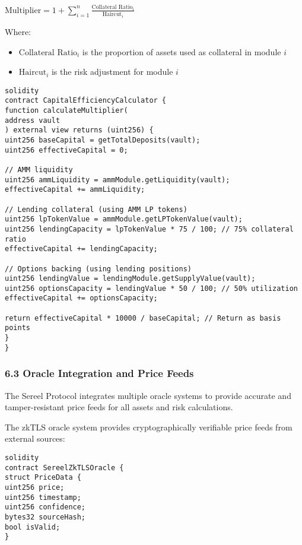\documentclass[12pt]{article}
\begin{document}
{{{$\text{Multiplier} = 1 + \sum_{i=1}^{n} \frac{\text{Collateral Ratio}_i}{\text{Haircut}_i}$

Where:
\begin{itemize}
	\item $\text{Collateral Ratio}_i$ is the proportion of assets used as collateral in module $i$
	\item $\text{Haircut}_i$ is the risk adjustment for module $i$

\end{itemize}

\begin{lstlisting}
solidity
contract CapitalEfficiencyCalculator {
function calculateMultiplier(
address vault
) external view returns (uint256) {
uint256 baseCapital = getTotalDeposits(vault);
uint256 effectiveCapital = 0;

// AMM liquidity
uint256 ammLiquidity = ammModule.getLiquidity(vault);
effectiveCapital += ammLiquidity;

// Lending collateral (using AMM LP tokens)
uint256 lpTokenValue = ammModule.getLPTokenValue(vault);
uint256 lendingCapacity = lpTokenValue * 75 / 100; // 75% collateral ratio
effectiveCapital += lendingCapacity;

// Options backing (using lending positions)
uint256 lendingValue = lendingModule.getSupplyValue(vault);
uint256 optionsCapacity = lendingValue * 50 / 100; // 50% utilization
effectiveCapital += optionsCapacity;

return effectiveCapital * 10000 / baseCapital; // Return as basis points
}
}
\end{lstlisting}

\subsubsection{6.3 Oracle Integration and Price Feeds} %

The Sereel Protocol integrates multiple oracle systems to provide accurate and tamper-resistant price feeds for all assets and risk calculations.


The zkTLS oracle system provides cryptographically verifiable price feeds from external sources:


\begin{lstlisting}
solidity
contract SereelZkTLSOracle {
struct PriceData {
uint256 price;
uint256 timestamp;
uint256 confidence;
bytes32 sourceHash;
bool isValid;
}


\end{lstlisting}}}}
\end{document}
